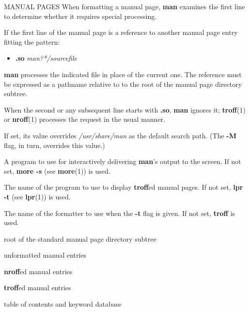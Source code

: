 \begin{manpage}
\begin{manblock}{MANUAL PAGES}
When formatting a manual page, {\bf man} examines the first line to
determine whether it requires special processing.

\hspace{-.2in}{\bf Referring to Other Manual Pages}

If the first line of the manual page is a reference to another
manual page entry fitting the pattern:
\begin{itemize}
\item[]
{\bf .so} {\it man?*/sourcefile}
\end{itemize}
{\bf man} processes the indicated file in place of the current one. 
The reference must be expressed as a pathname relative to to the root
of the manual page directory subtree.

When the second or any subsequent line starts with {\bf .so}, {\bf man}
ignores it; {\bf troff}(1) or {\bf nroff}(1) processes the request in
the usual manner. 
\end{manblock}
\begin{environment}\begin{environmentlist}
\item[MANPATH]If set, its value overrides {\it /usr/share/man} as the
      default search path. (The {\bf -M} flag, in turn, overrides this
      value.)  
\item[PAGER]A program to use for interactively delivering {\bf man}'s
      output to the screen.  If not set, {\bf more -s} (see {\bf
      more}(1)) is used.
\item[TCAT]The name of the program to use to display {\bf troff}ed
      manual pages.  If not set, {\bf lpr -t} (see {\bf lpr}(1)) is
      used. 
\item[TROFF]The name of the formatter to use when the {\bf -t} flag is
      given.  If not set, {\bf troff} is used.
\end{environmentlist}\end{environment}
\begin{files}\begin{filelist}
\item[/usr/man]root of the standard manual page directory subtree
\item[/usr/share/man/man?/*]unformatted manual entries
\item[/usr/share/man/cat?/*]{\bf nroff}ed manual entries
\item[/usr/share/man/fmt?/*]{\bf troff}ed manual entries
\item[/usr/share/man/whatis]table of contents and keyword database

\end{filelist}
\end{files}
\end{manpage}
